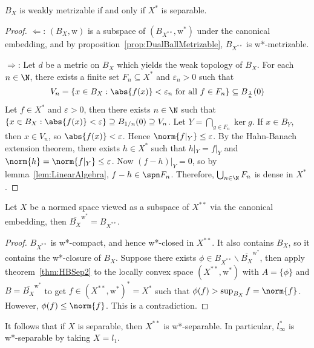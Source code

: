 \documentclass[a4paper]{article}
\begin{document}
\begin{nprop}\label{prop:BallWeakMetrizable}
  $B_X$ is weakly metrizable if and only if $X^*$ is separable.
\end{nprop}

\begin{proof}
	$\Longleftarrow$: $(B_X,\mathrm{w})$ is a subspace of $(B_{X^{**}},\mathrm{w^*})$ under the canonical embedding, and by proposition~\ref{prop:DualBallMetrizable}, $B_{X^{**}}$ is w*-metrizable.

	$\Longrightarrow$: Let $d$ be a metric on $B_X$ which yields the weak topology of $B_X$. For each $n\in\N$, there exists a finite set $F_n\subseteq X^*$ and $\varepsilon_n>0$ such that
	\[
	 V_n=\{x\in B_X:\abs{f(x)}<\varepsilon_n\text{ for all }f\in F_n\}\subseteq B_{\frac{1}{n}}(0)
	\]
	Let $f\in X^*$ and $\varepsilon>0$, then there exists $n\in\N$ such that $\{x\in B_X:\abs{f(x)}<\varepsilon\}\supseteq B_{1/n}(0)\supseteq V_n$. Let $Y=\bigcap_{g\in F_n}\ker g$. If $x\in B_Y$, then $x\in V_n$, so $\abs{f(x)}<\varepsilon$. Hence $\norm{f|_Y}\leq\varepsilon$. By the Hahn-Banach extension theorem, there exists $h\in X^*$ such that $h|_Y=f|_Y$ and $\norm{h}=\norm{f|_Y}\leq\varepsilon$. Now $(f-h)|_Y=0$, so by lemma~\ref{lem:LinearAlgebra}, $f-h\in\spn F_n$. Therefore, $\bigcup_{n\in\N}F_n$ is dense in $X^*$.
\end{proof}

\begin{nthm}\label{thm:Goldstine}
  Let $X$ be a normed space viewed as a subspace of $X^{**}$ via the canonical embedding, then $\overline{B_X}^{\mathrm{w^*}}=B_{X^{**}}$.
\end{nthm}

\begin{proof}
  $B_{X^{**}}$ is w*-compact, and hence w*-closed in $X^{**}$. It also contains $B_X$, so it contains the w*-closure of $B_X$. Suppose there exists $\phi\in B_{X^{**}}\backslash\overline{B_X}^{\mathrm{w^*}}$, then apply theorem~\ref{thm:HBSep2} to the locally convex space $(X^{**},\mathrm{w^*})$ with $A=\{\phi\}$ and $B=\overline{B_X}^{\mathrm{w^*}}$ to get $f\in(X^{**},\mathrm{w^*})^*=X^*$ such that $\phi(f)>\sup_{B_X} f=\norm{f}$. However, $\phi(f)\leq\norm{f}$. This is a contradiction.
\end{proof}

\begin{remark}
  It follows that if $X$ is separable, then $X^{**}$ is w*-separable. In particular, $l_\infty^*$ is w*-separable by taking $X=l_1$.
\end{remark}
\end{document}
